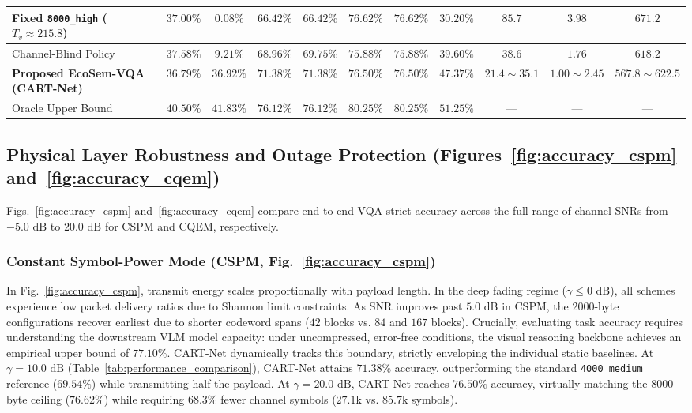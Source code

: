 \begin{table}[!t]
{\begin{tabular}{lcccccccccc}
Fixed \texttt{8000\_high} ($T_v \approx 215.8$) & $37.00\%$ & $0.08\%$ & $66.42\%$ & $66.42\%$ & $76.62\%$ & $76.62\%$ & $30.20\%$ & $85.7$ & $3.98$ & $671.2$ \\
\midrule
Channel-Blind Policy & $37.58\%$ & $9.21\%$ & $68.96\%$ & $69.75\%$ & $75.88\%$ & $75.88\%$ & $39.60\%$ & $38.6$ & $1.76$ & $618.2$ \\
\textbf{Proposed EcoSem-VQA (CART-Net)} & $\mathbf{36.79\%}$ & $\mathbf{36.92\%}$ & $\mathbf{71.38\%}$ & $\mathbf{71.38\%}$ & $\mathbf{76.50\%}$ & $\mathbf{76.50\%}$ & $\mathbf{47.37\%}$ & $\mathbf{21.4 \sim 35.1}$ & $\mathbf{1.00 \sim 2.45}$ & $\mathbf{567.8 \sim 622.5}$ \\
\midrule
Oracle Upper Bound & $40.50\%$ & $41.83\%$ & $76.12\%$ & $76.12\%$ & $80.25\%$ & $80.25\%$ & $51.25\%$ & --- & --- & --- \\
\bottomrule
\end{tabular}%
}
\end{table}

\subsection{Physical Layer Robustness and Outage Protection (Figures~\ref{fig:accuracy_cspm} and~\ref{fig:accuracy_cqem})}
Figs.~\ref{fig:accuracy_cspm} and~\ref{fig:accuracy_cqem} compare end-to-end VQA strict accuracy across the full range of channel SNRs from $-5.0\text{ dB}$ to $20.0\text{ dB}$ for CSPM and CQEM, respectively.

\subsubsection{Constant Symbol-Power Mode (CSPM, Fig.~\ref{fig:accuracy_cspm})}
In Fig.~\ref{fig:accuracy_cspm}, transmit energy scales proportionally with payload length. In the deep fading regime ($\gamma \le 0\text{ dB}$), all schemes experience low packet delivery ratios due to Shannon limit constraints. As SNR improves past $5.0\text{ dB}$ in CSPM, the 2000-byte configurations recover earliest due to shorter codeword spans ($42$ blocks vs. $84$ and $167$ blocks).
Crucially, evaluating task accuracy requires understanding the downstream VLM model capacity: under uncompressed, error-free conditions, the visual reasoning backbone achieves an empirical upper bound of $77.10\%$. CART-Net dynamically tracks this boundary, strictly enveloping the individual static baselines. At $\gamma = 10.0\text{ dB}$ (Table~\ref{tab:performance_comparison}), CART-Net attains $71.38\%$ accuracy, outperforming the standard \texttt{4000\_medium} reference ($69.54\%$) while transmitting half the payload. At $\gamma = 20.0\text{ dB}$, CART-Net reaches $76.50\%$ accuracy, virtually matching the 8000-byte ceiling ($76.62\%$) while requiring $68.3\%$ fewer channel symbols ($27.1\text{k}$ vs. $85.7\text{k}$ symbols).

